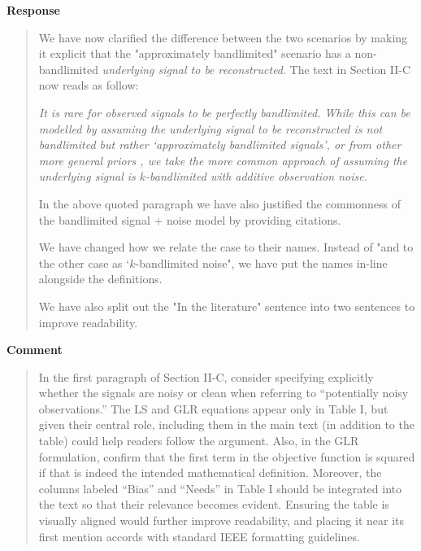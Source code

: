 \documentclass[11pt,onecolumn,journal]{IEEEtran}
\theoremstyle{definition}
\begin{document}
\textbf{Response}
\begin{quote}
We have now clarified the difference between the two scenarios by making it explicit that the "approximately bandlimited" scenario has a non-bandlimited \emph{underlying signal to be reconstructed}. The text in Section II-C now reads as follow:

{\it It is rare for observed signals to be perfectly bandlimited. While this can be modelled by assuming the underlying signal to be reconstructed is not bandlimited but rather `approximately bandlimited signals'\cite{chen2016signal, lin2019active}, or from other more general priors \cite{tanaka2020generalized, hara2022sampling}, we take the more common approach \cite{wang2018optimal, wang2019low,bai2020fast, puy2018random, tremblay2017determinantal} of assuming the underlying signal is $k$-bandlimited with additive observation noise.}

In the above quoted paragraph we have also justified the commonness of the bandlimited signal + noise model by providing citations.

We have changed how we relate the case to their names. Instead of "and to the other case as `$k$-bandlimited noise", we have put the names in-line alongside the definitions.

We have also split out the "In the literature" sentence into two sentences to improve readability.
\end{quote}

\textbf{Comment}
\begin{quote}
In the first paragraph of Section II-C, consider specifying explicitly whether the signals are noisy or clean when referring to “potentially noisy observations.” The LS and GLR equations appear only in Table I, but given their central role, including them in the main text (in addition to the table) could help readers follow the argument. Also, in the GLR formulation, confirm that the first term in the objective function is squared if that is indeed the intended mathematical definition. Moreover, the columns labeled “Bias” and “Needs” in Table I should be integrated into the text so that their relevance becomes evident. Ensuring the table is visually aligned would further improve readability, and placing it near its first mention accords with standard IEEE formatting guidelines.
\end{quote}
\end{document}
